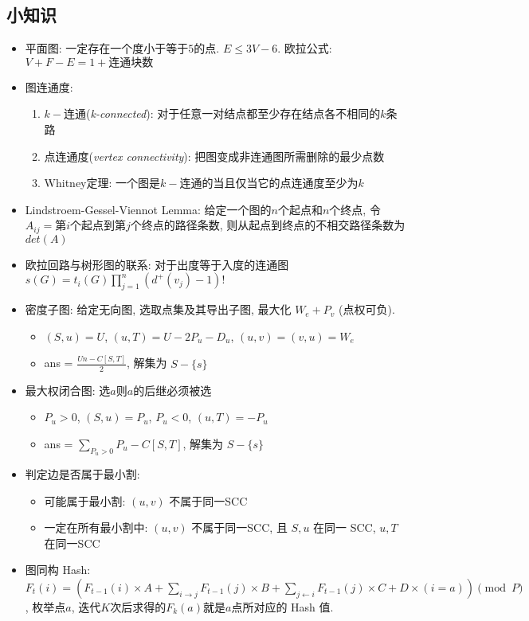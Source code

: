 \documentclass[landscape, twocolumn, 8pt, a4paper, twoside]{extarticle}
\begin{document}
\subsection{小知识}
\begin{itemize}
\item 平面图: 一定存在一个度小于等于$5$的点. $E \le 3V - 6$. 欧拉公式: $V + F - E = 1 + \mbox{连通块数}$
\item 图连通度: 
  \begin{enumerate}
  \item $k-$连通(\emph{k-connected}): 对于任意一对结点都至少存在结点各不相同的$k$条路
  \item 点连通度(\emph{vertex connectivity}): 把图变成非连通图所需删除的最少点数
  \item Whitney定理: 一个图是$k-$连通的当且仅当它的点连通度至少为$k$
  \end{enumerate}
\item Lindstroem-Gessel-Viennot Lemma:
  给定一个图的$n$个起点和$n$个终点, 
  令$A_{ij} = $第$i$个起点到第$j$个终点的路径条数,
  则从起点到终点的不相交路径条数为 $det(A)$
\item 欧拉回路与树形图的联系: 
  对于出度等于入度的连通图
  $s(G) = t_i(G) \prod_{j = 1}^{n} (d^+(v_j) - 1)! $
\item 密度子图: 给定无向图, 选取点集及其导出子图, 最大化 $W_e + P_v$ (点权可负).
  \begin{itemize}
  \item $(S, u) = U$, $(u, T) = U - 2 P_u - D_u$, $(u, v) = (v, u) = W_e$
  \item ans = $\frac{Un - C[S, T]}{2}$, 解集为 $S - \{s\}$
  \end{itemize}
\item 最大权闭合图: 选$a$则$a$的后继必须被选
  \begin{itemize}
  \item $P_u > 0$, $(S, u) = P_u$, $P_u < 0$, $(u, T) = -P_u$
  \item ans = $\sum\limits_{P_u > 0}^{} P_u - C[S, T]$, 解集为 $S - \{s\}$
  \end{itemize}
\item 判定边是否属于最小割:
  \begin{itemize}
  \item 可能属于最小割: $(u, v)$ 不属于同一SCC
  \item 一定在所有最小割中: $(u, v)$ 不属于同一SCC, 且 $S, u$ 在同一 SCC, $u, T$ 在同一SCC
  \end{itemize}
\item 图同构 Hash: $F_t(i) = (F_{t - 1}(i) \times A
  + \sum_{i \rightarrow j} F_{t - 1}(j) \times B
  + \sum_{j \leftarrow i} F_{t - 1}(j) \times C
  + D \times (i = a)
  ) \pmod{P}$, 枚举点$a$, 迭代$K$次后求得的$F_k(a)$就是$a$点所对应的 Hash 值. 
\end{itemize}
\end{document}
